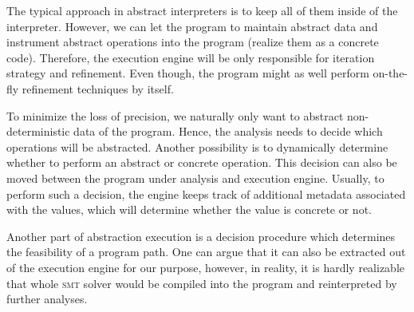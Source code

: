 The typical approach in abstract interpreters is to keep all of them inside of
the interpreter. However, we can let the program to maintain abstract data and
instrument abstract operations into the program (realize them as a concrete
code). Therefore, the execution engine will be only responsible for iteration
strategy and refinement. Even though, the program might as well perform on-the-fly
refinement techniques by itself.

To minimize the loss of precision, we naturally only want to abstract
non-deterministic data of the program. Hence, the analysis needs to decide which
operations will be abstracted. Another possibility is to dynamically determine
whether to perform an abstract or concrete operation. This decision can also be
moved between the program under analysis and execution engine. Usually, to
perform such a decision, the engine keeps track of additional metadata
associated with the values, which will determine whether the value is concrete
or not.

Another part of abstraction execution is a decision procedure which determines
the feasibility of a program path. One can argue that it can also be extracted
out of the execution engine for our purpose, however, in reality, it is hardly
realizable that whole \textsc{smt} solver would be compiled into the program and
reinterpreted by further analyses.

